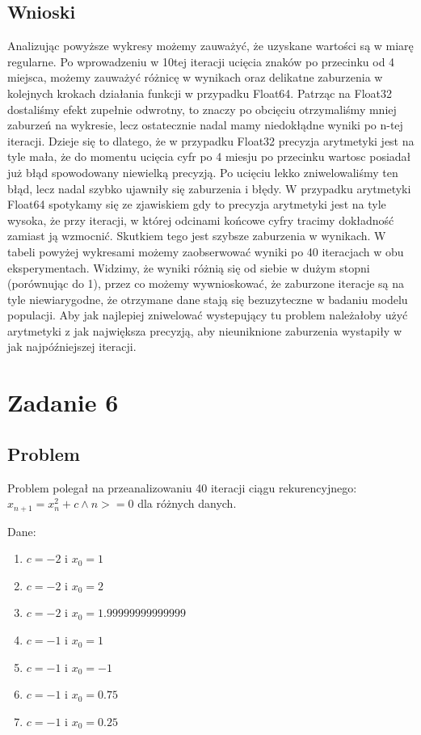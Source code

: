 \documentclass[11pt, a4paper]{article}
\begin{document}
\subsection{Wnioski}
Analizując powyższe wykresy możemy zauważyć, że uzyskane wartości są w miarę regularne. Po wprowadzeniu w 10tej iteracji ucięcia znaków po przecinku od 4 miejsca, możemy zauważyć różnicę w wynikach oraz delikatne zaburzenia w kolejnych krokach działania funkcji w przypadku Float64. Patrząc na Float32 dostaliśmy efekt zupełnie odwrotny, to znaczy po obcięciu otrzymaliśmy mniej zaburzeń na wykresie, lecz ostatecznie nadal mamy niedokłądne wyniki po n-tej iteracji. Dzieje się to dlatego, że w przypadku Float32 precyzja arytmetyki jest na tyle mała, że do momentu ucięcia cyfr po 4 miesju po przecinku wartosc posiadał już błąd spowodowany niewielką precyzją. Po ucięciu lekko zniwelowaliśmy ten błąd, lecz nadal szybko ujawniły się zaburzenia i błędy. W przypadku arytmetyki Float64 spotykamy się ze zjawiskiem gdy to precyzja arytmetyki jest na tyle wysoka, że przy iteracji, w której odcinami końcowe cyfry tracimy dokładność zamiast ją wzmocnić. Skutkiem tego jest szybsze zaburzenia w wynikach. W tabeli powyżej wykresami możemy zaobserwować wyniki po 40 iteracjach w obu eksperymentach. Widzimy, że wyniki różnią się od siebie w dużym stopni (porównując do 1), przez co możemy wywnioskować, że zaburzone iteracje są na tyle niewiarygodne, że otrzymane dane stają się bezuzyteczne w badaniu modelu populacji. Aby jak najlepiej zniwelować wystepujący tu problem należałoby użyć arytmetyki z jak największa precyzją, aby nieuniknione zaburzenia wystapiły w jak najpóźniejszej iteracji.

\section{Zadanie 6}
\subsection{Problem}
Problem polegał na przeanalizowaniu 40 iteracji ciągu rekurencyjnego: $x_{n+1} = x_{n}^2 + c \land n>=0$ dla różnych danych.

Dane:
\begin{enumerate}
\item $c = -2$ i $x_{0} = 1$
\item $c = -2$ i $x_{0} = 2$
\item $c = -2$ i $x_{0} = 1.99999999999999$
\item $c = -1$ i $x_{0} = 1$
\item $c = -1$ i $x_{0} = -1$
\item $c = -1$ i $x_{0} = 0.75$
\item $c = -1$ i $x_{0} = 0.25$
\end{enumerate}
\end{document}
